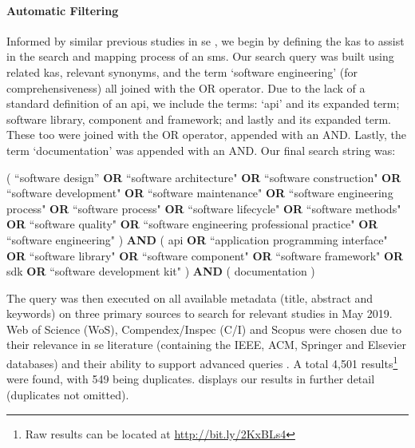 \paragraph{Automatic Filtering}

Informed by similar previous studies in \gls{se}  \citep{Glass:2002wa,Usman:2017hn,GAROUSI2019101}, we begin by defining the  \citep{IEEE:1990wp} \glspl{ka} to assist in the search and mapping process of an \gls{sms}. Our search query was built using related \glspl{ka}, relevant synonyms, and the term `software engineering' (for comprehensiveness) all joined with the OR operator. Due to the lack of a standard definition of an \gls{api}, we include the terms: `\gls{api}' and its expanded term; software library, component and framework; and lastly  and its expanded term. These too were joined with the OR operator, appended with an AND. Lastly, the term `documentation' was appended with an AND.
Our final search string was:
\begin{framed}
\noindent
\parbox{\linewidth}{
\footnotesize
( ``software design'' \textbf{OR} ``software architecture" \textbf{OR} ``software construction" \textbf{OR} ``software development" \textbf{OR} ``software maintenance" \textbf{OR} ``software engineering process" \textbf{OR} ``software process" \textbf{OR} ``software lifecycle" \textbf{OR} ``software methods" \textbf{OR} ``software quality" \textbf{OR} ``software engineering professional practice" \textbf{OR} ``software engineering" ) \textbf{AND} ( \gls{api} \textbf{OR} ``application programming interface" \textbf{OR} ``software library" \textbf{OR} ``software component" \textbf{OR} ``software framework" \textbf{OR} sdk \textbf{OR} ``software development kit" ) \textbf{AND} ( documentation )
}
\end{framed}

The query was then executed on all available metadata (title, abstract and keywords) on three primary sources to search for relevant studies in May 2019. Web of Science  (WoS), Compendex/Inspec (C/I) and Scopus were chosen due to their relevance in \gls{se} literature (containing the IEEE, ACM, Springer and Elsevier databases) and their ability to support advanced queries \citep{Brereton:2007by,Kitchenham:2007dd}. A total 4,501 results\footnote{Raw results can be located at \url{http://bit.ly/2KxBLs4}} were found, with 549 being duplicates.  displays our results in further detail (duplicates not omitted).%

